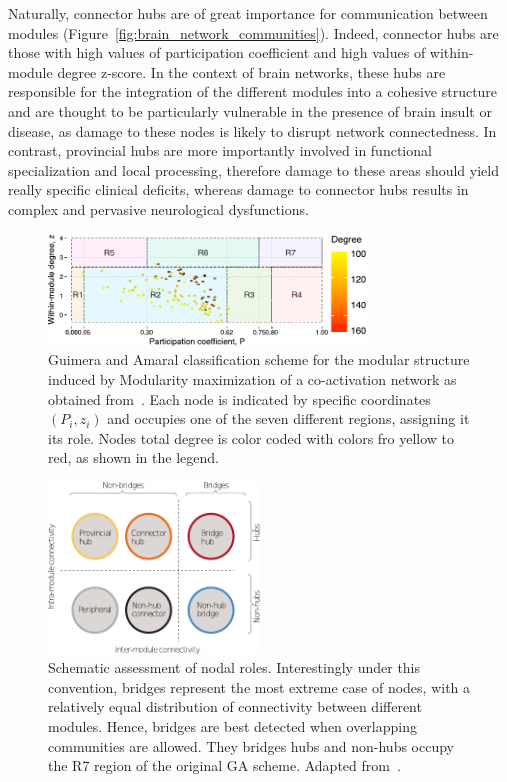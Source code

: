 Naturally, connector hubs are of great importance for communication between modules (Figure~\ref{fig:brain_network_communities}).
Indeed, connector hubs are those with high values of participation coefficient and high values of within-module degree z-score.
In the context of brain networks, these hubs are responsible for the integration of the different modules into a cohesive structure and are thought to be particularly vulnerable in the presence of brain insult or disease, as damage to these nodes is likely to disrupt network connectedness.
In contrast, provincial hubs are more importantly involved in functional specialization and local processing, therefore damage to these areas should yield really specific clinical deficits, whereas damage to connector hubs results in complex and pervasive neurological dysfunctions.


\begin{figure}[htb!]
\centering
\includegraphics[width=0.75\textwidth]{images/guimera_amaral_coact_q.pdf}
\caption{Guimera and Amaral classification scheme for the modular structure induced by Modularity maximization of a co-activation network as obtained from~\cite{crossley2013a}. Each node is indicated by specific coordinates $(P_i,z_i)$ and occupies one of the seven different regions, assigning it its role. Nodes total degree is color coded with colors fro yellow to red, as shown in the legend.}
\label{fig:gagraph}
\end{figure}

\begin{figure}[htb!]
\centering
\includegraphics[width=0.5\textwidth]{images/hubs_nonhubs.pdf}
\caption{Schematic assessment of nodal roles. Interestingly under this convention, bridges represent the most extreme case of nodes, with a relatively equal distribution of connectivity between different modules. Hence, bridges are best detected when overlapping communities are allowed. They bridges hubs and non-hubs occupy the R7 region of the original GA scheme. Adapted from~\cite{fornito2015}.}
\label{fig:hubs_bridges}
\end{figure}

